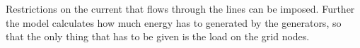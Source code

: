 \documentclass[a4paper]{article}
\begin{document}
Restrictions on the current that flows through the lines can be imposed. Further the model calculates how much energy has to generated by the generators, so that the only thing that has to be given is the load on the grid nodes.

\end{document}
